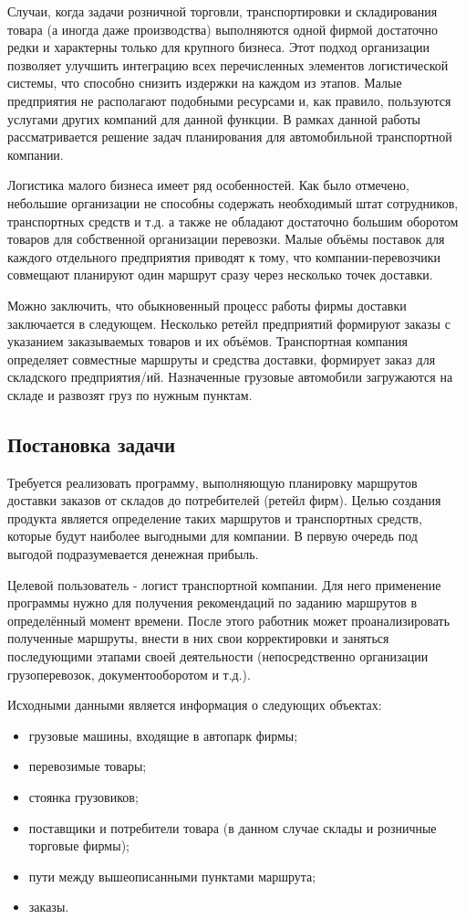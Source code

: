 	Случаи, когда задачи розничной торговли, транспортировки и складирования товара (а иногда даже производства) выполняются одной фирмой достаточно редки и характерны только для крупного бизнеса. Этот подход организации позволяет улучшить интеграцию всех перечисленных элементов логистической системы, что способно снизить издержки на каждом из этапов. Малые предприятия не располагают подобными ресурсами и, как правило, пользуются услугами других компаний для данной функции. В рамках данной работы рассматривается решение задач планирования для автомобильной транспортной компании.
	
	Логистика малого бизнеса имеет ряд особенностей\cite{subj:small_business}. Как было отмечено, небольшие организации не способны содержать необходимый штат сотрудников, транспортных средств и т.д. а также не обладают достаточно большим оборотом товаров для собственной организации перевозки. Малые объёмы поставок для каждого отдельного предприятия приводят к тому, что компании-перевозчики совмещают планируют один маршрут сразу через несколько точек доставки.
	
	Можно заключить, что обыкновенный процесс работы фирмы доставки заключается в следующем. Несколько ретейл предприятий формируют заказы с указанием заказываемых товаров и их объёмов. Транспортная компания определяет совместные маршруты и средства доставки, формирует заказ для складского предприятия/ий. Назначенные грузовые автомобили загружаются на складе и развозят груз по нужным пунктам.

\subsection{Постановка задачи}
	Требуется реализовать программу, выполняющую планировку маршрутов доставки заказов от складов до потребителей (ретейл фирм). Целью создания продукта является определение таких маршрутов и транспортных средств, которые будут наиболее выгодными для компании. В первую очередь под выгодой подразумевается денежная прибыль.
	
	Целевой пользователь - логист транспортной компании. Для него применение программы нужно для получения рекомендаций по заданию маршрутов в определённый момент времени. После этого работник может проанализировать полученные маршруты, внести в них свои корректировки и заняться последующими этапами своей деятельности (непосредственно организации грузоперевозок, документооборотом и т.д.).
	
	Исходными данными является информация о следующих объектах:
	\begin{itemize}
		\item грузовые машины, входящие в автопарк фирмы;
		\item перевозимые товары;
		\item стоянка грузовиков;
		\item поставщики и потребители товара (в данном случае склады и розничные торговые фирмы);
		\item пути между вышеописанными пунктами маршрута;
		\item заказы.
	\end{itemize}

